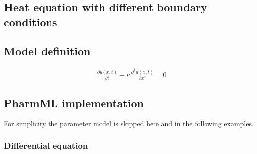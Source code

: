 \subsection{Heat equation with different boundary conditions}
\label{sec:heatEq}


\subsection*{Model definition}

\begin{align}
& \frac{\partial u(x,t)}{\partial t}  - \kappa \frac{\partial^2 u(x,t)}{\partial x^2} = 0 \nonumber
\end{align}

\subsection*{PharmML implementation}
For simplicity the parameter model is skipped here and in the following examples.

\subsubsection*{Differential equation}

